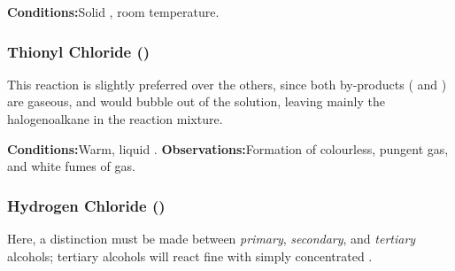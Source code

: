 				\vspace{1.5em}
				\vbox{\textbf{Conditions:}\tabto{35mm}Solid , room temperature.}


			\subsubsection{Thionyl Chloride ()}

				This reaction is slightly preferred over the others, since both by-products ( and ) are
				gaseous, and would bubble out of the solution, leaving mainly the halogenoalkane in the reaction mixture.

				\vspace{1.5em}
				\vbox{\textbf{Conditions:}\tabto{35mm}Warm, liquid .}\vspace{0.5em}
				\vbox{\textbf{Observations:}\tabto{35mm}Formation of colourless, pungent  gas, and
											\tabto{35mm}white fumes of  gas.}


			\pagebreak
			\subsubsection{Hydrogen Chloride ()}

				Here, a distinction must be made between \textit{primary}, \textit{secondary}, and \textit{tertiary} alcohols;
				tertiary alcohols will react fine with simply concentrated .

